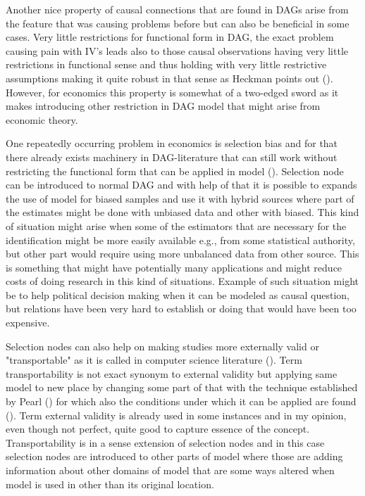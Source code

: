 \documentclass[main=english,12pt,a4paper,pdftex,econ,utf8]{aaltothesis}
\begin{document}
Another nice property of causal connections that are found in DAGs arise from the feature that was causing problems before but can also be beneficial in some cases. Very little restrictions for functional form in DAG, the exact problem causing pain with IV's leads also to those causal observations having very little restrictions in functional sense and thus holding with very little restrictive assumptions making it quite robust in that sense as Heckman points out (\cite{Heckman2015}). However, for economics this property is somewhat of a two-edged sword as it makes introducing other restriction in DAG model that might arise from economic theory.

One repeatedly occurring problem in economics is selection bias and for that there already exists machinery in DAG-literature that can still work without restricting the functional form that can be applied in model (\cite{Bareinboim2014}). Selection node can be introduced to normal DAG and with help of that it is possible to expands the use of model for biased samples and use it with hybrid sources where part of the estimates might be done with unbiased data and other with biased. This kind of situation might arise when some of the estimators that are necessary for the identification might be more easily available e.g., from some statistical authority, but other part would require using more unbalanced data from other source. This is something that might have potentially many applications and might reduce costs of doing research in this kind of situations. Example of such situation might be to help political decision making when it can be modeled as causal question, but relations have been very hard to establish or doing that would have been too expensive.

Selection nodes can also help on making studies more externally valid or "transportable" as it is called in computer science literature (\cite{Pearl2011}). Term transportability is not exact synonym to external validity but applying same model to new place by changing some part of that with the technique established by Pearl (\cite{Pearl2011}) for which also the conditions under which it can be applied are found (\cite{Bareinboim2012a}). Term external validity is already used in some instances and in my opinion, even though not perfect, quite good to capture essence of the concept. Transportability is in a sense extension of selection nodes and in this case selection nodes are introduced to other parts of model where those are adding information about other domains of model that are some ways altered when model is used in other than its original location. 
\end{document}
